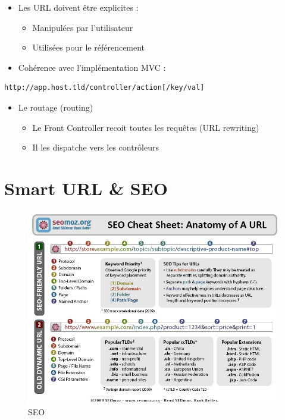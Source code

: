 \begin{itemize}
\tightlist
\item
  Les URL doivent être explicites :

  \begin{itemize}
  \tightlist
  \item
    Manipulées par l'utilisateur
  \item
    Utilisées pour le référencement
  \end{itemize}
\item
  Cohérence avec l'implémentation MVC :
\end{itemize}

\begin{english}

\begin{verbatim}
http://app.host.tld/controller/action[/key/val]
\end{verbatim}

\end{english}

\begin{itemize}
\tightlist
\item
  Le routage (routing)

  \begin{itemize}
  \tightlist
  \item
    Le Front Controller recoit toutes les requêtes (URL rewriting)
  \item
    Il les dispatche vers les contrôleurs
  \end{itemize}
\end{itemize}

\hypertarget{smart-url-seo}{%
\section{Smart URL \& SEO}\label{smart-url-seo}}

\begin{figure}
\centering
\includegraphics{src/img/anatomy-of-a-url.jpg}
\caption{SEO}
\end{figure}

